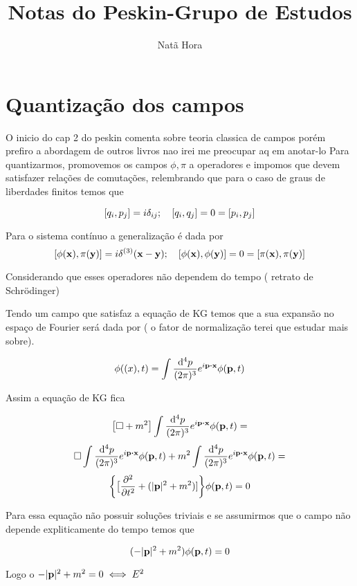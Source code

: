 \documentclass{article}
\title{Notas do Peskin-Grupo de Estudos}
\author{Natã Hora}
\begin{document}
	\maketitle
	\section{Quantização dos campos}
	O inicio do cap 2 do peskin comenta sobre teoria classica de campos porém prefiro a abordagem de outros livros nao irei me preocupar aq em anotar-lo
	Para quantizarmos, promovemos os campos $\phi,\pi$ a operadores e impomos que devem satisfazer relações de comutações, relembrando que para o caso de graus de liberdades finitos temos que
	
	$$ \qty[q_i,p_j]=i \delta_{ij}; \quad \qty[q_i,q_j]=0=\qty[p_i,p_j]$$	


	Para o sistema contínuo a generalização é dada por 
	$$ \qty[\phi(\vb{x}),\pi(\vb{y})]=i\delta^{(3)}(\vb{x-y}); \quad \qty[\phi(\vb{x}),\phi(\vb{y})]=0=\qty[\pi(\vb{x}),\pi(\vb{y})]$$	
	
Considerando que esses operadores não dependem do tempo ( retrato de Schrödinger)

Tendo um campo que satisfaz a equação de KG temos que a sua expansão no espaço de Fourier será dada por ( o fator de normalização terei que estudar mais sobre).

$$\phi ( \vb(x),t)=\int \frac{\dd[4]{p}}{(2\pi)^3}e^{i \vb{p} \vdot \vb{x}} \phi( \vb{p},t)$$

Assim a equação de KG fica 


$$\qty\big[\Box+m^2] \int \frac{\dd[4]{p}}{(2\pi)^3}e^{i \vb{p} \vdot \vb{x}} \phi( \vb{p},t)=$$
$$\Box\int \frac{\dd[4]{p}}{(2\pi)^3}e^{i \vb{p} \vdot \vb{x}} \phi( \vb{p},t)
+m^2\int \frac{\dd[4]{p}}{(2\pi)^3}e^{i \vb{p} \vdot \vb{x}} \phi( \vb{p},t)=$$
$$\qty{\big[\pdv[2]{t}+(|\vb{p}|^2+m^2)]}\phi(\vb{p},t)=0$$

Para essa equação não possuir soluções triviais e se assumirmos que o campo não depende expliticamente do tempo temos que

 $$(-|\vb{p}|^2+m^2)\phi(\vb{p},t)=0$$
 
Logo o  $-|\vb{p}|^2+m ^2=0 \iff E^2$ 
\end{document}
